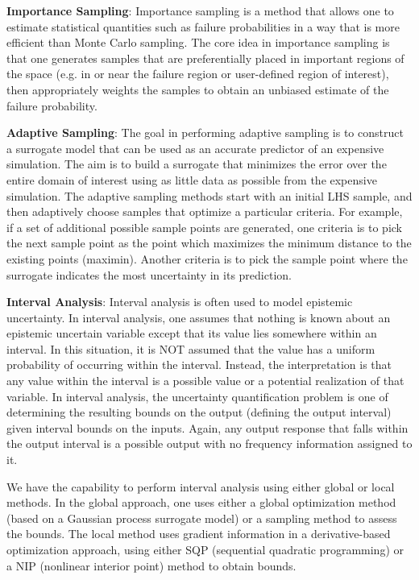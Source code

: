 \textbf{Importance Sampling}: Importance sampling is a method that 
allows one to estimate statistical quantities such as failure 
probabilities in a way that is more efficient than Monte Carlo 
sampling. The core idea in importance sampling is that one generates 
samples that are preferentially placed in important regions of the 
space (e.g. in or near the failure region or user-defined region
of interest), then appropriately weights the samples to obtain an 
unbiased estimate of the failure probability.

\textbf{Adaptive Sampling}: The goal in performing adaptive 
sampling is to construct a surrogate
model that can be used as an accurate predictor of an expensive 
simulation. The aim is to build a surrogate that minimizes the error
over the entire domain of interest using as little data as possible 
from the expensive simulation. The adaptive sampling methods start
with an initial LHS sample, and then adaptively choose samples that 
optimize a particular criteria. For example, if a set of additional 
possible sample points are generated, one criteria is to pick the
next sample point as the point which maximizes the minimum distance 
to the existing points (maximin). Another criteria is to pick the 
sample point where the surrogate indicates the most uncertainty 
in its prediction. 

\textbf{Interval Analysis}: Interval analysis is often used to model 
epistemic uncertainty. In interval analysis, one assumes that nothing 
is known about an epistemic uncertain variable except that its value lies 
somewhere within an interval. In this situation, it is NOT 
assumed that the value has a uniform probability of occurring 
within the interval. Instead, the interpretation is that 
any value within the interval is a possible value or a potential 
realization of that variable. In interval analysis, the 
uncertainty quantification problem is one of determining the 
resulting bounds on the output (defining the output interval) 
given interval bounds on the inputs. Again, any output response 
that falls within the output interval is a possible output 
with no frequency information assigned to it.

We have the capability to perform interval analysis using either
global or local methods. In the global approach, one uses either a 
global optimization method (based on a Gaussian process surrogate model)
or a sampling method to assess the bounds. The
local method uses gradient information in a derivative-based 
optimization approach, using either SQP (sequential quadratic 
programming) or a NIP (nonlinear interior point) method to obtain bounds. 
 
